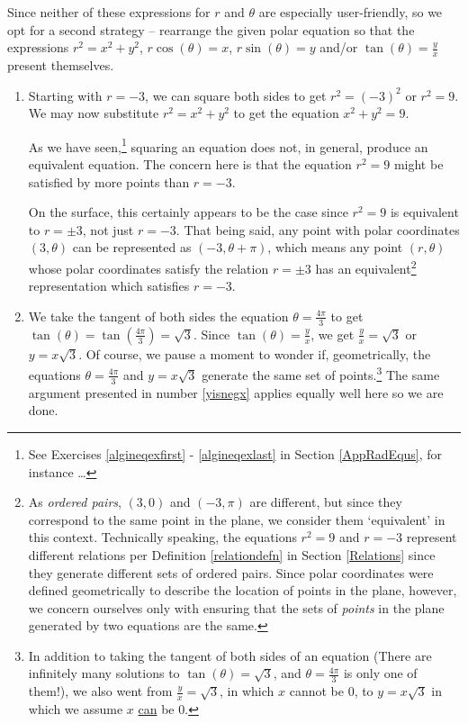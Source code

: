 \documentclass{ximera}
\begin{document}
\begin{example}
\begin{enumerate}
Since neither of these expressions for $r$ and $\theta$ are especially user-friendly, so we opt for a second strategy -- rearrange the given polar equation so that the expressions $r^2 = x^2+y^2$, $r\cos(\theta)=x$,  $r\sin(\theta)=y$ and/or $\tan(\theta) = \frac{y}{x}$ present themselves.

\begin{enumerate}

\item Starting with $r = -3$, we can square both sides to get  $r^2 = (-3)^2$ or $r^2 = 9$.  We may now substitute $r^2 = x^2+y^2$ to get the equation $x^2+y^2 = 9$.  

\smallskip

As we have seen,\footnote{See Exercises \ref{algineqexfirst} - \ref{algineqexlast} in Section \ref{AppRadEqus}, for instance \ldots} squaring an equation does not, in general, produce an equivalent equation.  The concern here is that the equation $r^2 = 9$ might be satisfied by more points than  $r = -3$.  

\smallskip

On the surface, this certainly appears to be the case since $r^2 = 9$ is equivalent to $r = \pm 3$, not just $r=-3$.  That being said,  any point with polar coordinates $(3,\theta)$ can be represented as $(-3,\theta + \pi)$, which means any point $(r,\theta)$ whose polar coordinates satisfy the relation $r = \pm 3$ has an equivalent\footnote{As \textit{ordered pairs}, $(3,0)$ and $(-3,\pi)$ are different, but since they correspond to the same point in the plane, we consider them `equivalent'  in this context. Technically speaking,  the equations $r^2 = 9$ and $r=-3$ represent different relations per Definition \ref{relationdefn} in Section \ref{Relations} since they generate different sets of ordered pairs.  Since polar coordinates were defined geometrically to describe the location of points in the plane, however, we concern ourselves only with ensuring that the sets of \textit{points} in the plane generated by two equations are the same.  } representation which satisfies $r=-3$.

\item  We take the tangent of both sides the equation $\theta = \frac{4\pi}{3}$ to get $\tan(\theta) = \tan\left(\frac{4\pi}{3}\right) = \sqrt{3}$.  Since $\tan(\theta) = \frac{y}{x}$, we get $\frac{y}{x} = \sqrt{3}$ or $y = x\sqrt{3}$.  Of course, we pause a moment to wonder if, geometrically, the equations $\theta = \frac{4\pi}{3}$ and $y = x\sqrt{3}$ generate the same set of points.\footnote{In addition to taking the tangent of both sides of an equation (There are infinitely many solutions to $\tan(\theta) = \sqrt{3}$, and $\theta = \frac{4\pi}{3}$ is only one of them!), we also went from $\frac{y}{x} = \sqrt{3}$, in which $x$ cannot be $0$, to $y = x\sqrt{3}$ in which we assume $x$ \underline{can} be $0$.}  The same argument presented in number \ref{yisnegx} applies equally well here so we are done.


\end{enumerate}
\end{enumerate}
\end{example}
\end{document}
